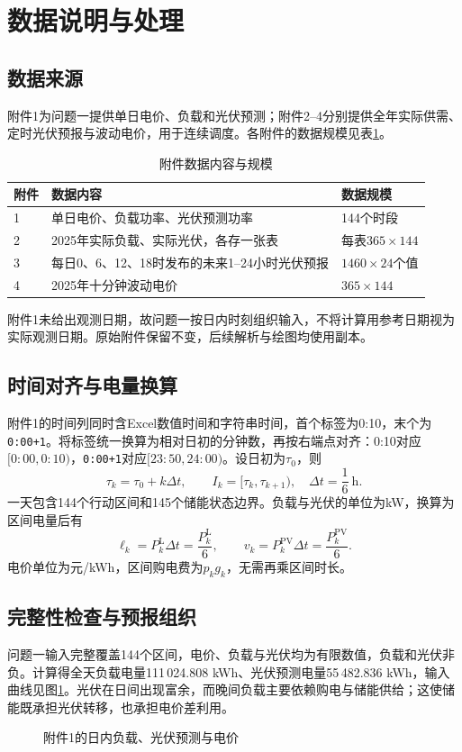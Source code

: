 \section{数据说明与处理}
\subsection{数据来源}
附件1为问题一提供单日电价、负载和光伏预测；附件2--4分别提供全年实际供需、定时光伏预报与波动电价，用于连续调度。各附件的数据规模见表\ref{tab:data}。
\begin{table}[H]
\centering
\caption{附件数据内容与规模}
\label{tab:data}
\small
\begin{tabular}{lp{7.4cm}l}
\toprule
附件 & 数据内容 & 数据规模 \\
\midrule
1 & 单日电价、负载功率、光伏预测功率 & 144个时段 \\
2 & 2025年实际负载、实际光伏，各存一张表 & 每表$365\times144$ \\
3 & 每日0、6、12、18时发布的未来1--24小时光伏预报 & $1460\times24$个值 \\
4 & 2025年十分钟波动电价 & $365\times144$ \\
\bottomrule
\end{tabular}
\end{table}
附件1未给出观测日期，故问题一按日内时刻组织输入，不将计算用参考日期视为实际观测日期。原始附件保留不变，后续解析与绘图均使用副本。

\subsection{时间对齐与电量换算}
附件1的时间列同时含Excel数值时间和字符串时间，首个标签为0:10，末个为\texttt{0:00+1}。将标签统一换算为相对日初的分钟数，再按右端点对齐：0:10对应$[0{:}00,0{:}10)$，\texttt{0:00+1}对应$[23{:}50,24{:}00)$。设日初为$\tau_0$，则
\begin{equation}
  \tau_k=\tau_0+k\Delta t,\qquad
  I_k=[\tau_k,\tau_{k+1}),\quad \Delta t=\frac16\ \mathrm h.
  \label{eq:timegrid}
\end{equation}
一天包含144个行动区间和145个储能状态边界。负载与光伏的单位为kW，换算为区间电量后有
\begin{equation}
  \ell_k=P_k^{\mathrm L}\Delta t=\frac{P_k^{\mathrm L}}6,
  \qquad v_k=P_k^{\mathrm{PV}}\Delta t=\frac{P_k^{\mathrm{PV}}}6.
  \label{eq:power-energy}
\end{equation}
电价单位为元/kWh，区间购电费为$p_kg_k$，无需再乘区间时长。

\subsection{完整性检查与预报组织}
问题一输入完整覆盖144个区间，电价、负载与光伏均为有限数值，负载和光伏非负。计算得全天负载电量111\,024.808 kWh、光伏预测电量55\,482.836 kWh，输入曲线见图\ref{fig:input}。光伏在日间出现富余，而晚间负载主要依赖购电与储能供给；这使储能既承担光伏转移，也承担电价差利用。
\begin{figure}[H]
  \centering
  \caption{附件1的日内负载、光伏预测与电价}
  \label{fig:input}
\end{figure}

